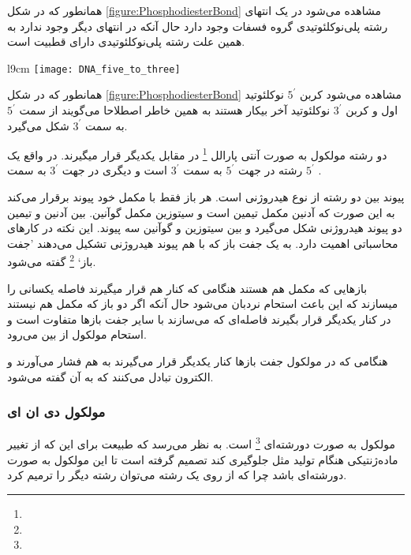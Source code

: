 همانطور که در شکل
\ref{figure:PhosphodiesterBond}
مشاهده می‌شود در یک انتهای رشته پلی‌نوکلئوتیدی گروه فسفات وجود دارد حال آنکه در انتهای دیگر وجود ندارد به همین علت رشته پلی‌نوکلئوتیدی دارای قطبیت است.

\pagebreak
\begin{wrapfigure}[22]{l}{9cm}
	\centering
	\texttt{[image: DNA\_five\_to\_three]}
	\caption{
	پیوند فسفودی‌استری
	\protect	
	\footnote{}
	بین  گروه فسفات متصل به کربن
	$ 5^\prime $
	یک نوکلئوتید و گروه هیدروکسیل
	\protect
	\footnote{}
	نوکلئوتید بعدی برقرار می‌شود.	
	}
	\label{figure:PhosphodiesterBond}
\end{wrapfigure}

همانطور که در شکل
\ref{figure:PhosphodiesterBond}
مشاهده می‌شود کربن
$ 5^\prime $
نوکلئوتید اول و کربن
$ 3^\prime $
نوکلئوتید آخر بیکار هستند به همین خاطر اصطلاحا می‌گویند
از سمت
$ 5^\prime $
به سمت
$ 3^\prime $
شکل می‌گیرد.

دو رشته مولکول
به صورت آنتی پارالل
\footnote{}
در مقابل یکدیگر قرار میگیرند. در واقع یک رشته در جهت
$ 5^\prime $
به سمت
$ 3^\prime $
است و دیگری در جهت
$ 3^\prime $
به سمت
$ 5^\prime $
.

پیوند بین دو رشته از نوع هیدروژنی است. هر باز فقط با مکمل خود پیوند برقرار می‌کند به این صورت که آدنین مکمل تیمین است و سیتوزین مکمل گوآنین.
بین آدنین و تیمین دو پیوند هیدروژنی شکل می‌گیرد و بین سیتوزین و گوآنین سه پیوند. این نکته در کار‌های محاسباتی اهمیت دارد.
به یک جفت باز که با هم پیوند هیدروژنی تشکیل می‌دهند 'جفت باز` 
\footnote{}
گفته می‌شود.

باز‌هایی که مکمل هم هستند هنگامی که کنار هم قرار میگیرند فاصله یکسانی را میسازند که این باعث استحام نردبان
می‌شود حال آنکه اگر دو باز که مکمل هم نیستند در کنار یکدیگر قرار بگیرند فاصله‌ای که می‌سازند با سایر جفت بازها متفاوت است و استحام مولکول
از بین می‌رود.

هنگامی که در مولکول
جفت بازها کنار یکدیگر قرار می‌گیرند به هم فشار می‌آورند و الکترون تبادل می‌کنند که به آن
گفته می‌شود.

\pagebreak
\subsubsection{مولکول دی ان ای}
مولکول
به صورت دورشته‌ای
\footnote{}
است. به نظر می‌رسد که طبیعت برای این که از تغییر ماده‌ژنتیکی هنگام تولید مثل جلوگیری کند تصمیم گرفته است تا این مولکول به صورت دورشته‌ای باشد چرا که از روی یک رشته می‌توان رشته دیگر را ترمیم کرد.

